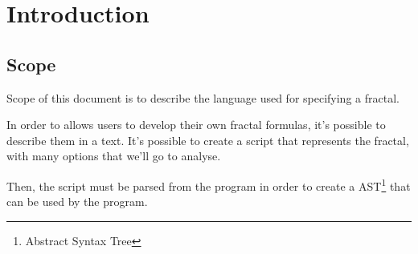 \chapter{Introduction}

\section{Scope}

Scope of this document is to describe the language used for specifying a fractal.

In order to allows users to develop their own fractal formulas, it's possible to describe them in a text. It's possible to create a script that represents the fractal, with many options that we'll go to analyse.

Then, the script must be parsed from the program in order to create a AST\footnote{Abstract Syntax Tree} that can be used by the program.



